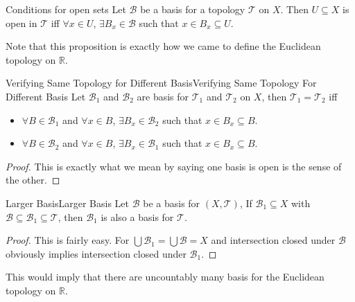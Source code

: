 \documentclass[../main.tex]{subfiles}
\begin{document}
\begin{proposition}{}{Conditions for open sets}
	Let $\mathcal{B}$ be a basis for a topology $\mathcal{T}$ on $X$. Then $U\subseteq X$ is open in $\mathcal{T}$ iff $\forall x\in U$, $\exists B_x\in \mathcal{B}$ such that $x\in B_x\subseteq U$.
\end{proposition}
Note that this proposition is exactly how we came to define the Euclidean topology on $\mathbb{R}$.

\begin{theorem}{Verifying Same Topology for Different Basis}{Verifying Same Topology For Different Basis}
Let $\mathcal{B}_1$ and $\mathcal{B}_2$ are basis for $\mathcal{T}_1$ and $\mathcal{T}_2$ on $X$, then $\mathcal{T}_1 = \mathcal{T}_2$ iff
\begin{itemize}
	\item $\forall B \in \mathcal{B}_1$ and $\forall x\in B$, $\exists B_x\in \mathcal{B}_2$ such that $x\in B_x\subseteq B$.
	\item $\forall B \in \mathcal{B}_2$ and $\forall x\in B$, $\exists B_x\in \mathcal{B}_1$ such that $x\in B_x\subseteq B$.
\end{itemize}
\end{theorem}
\begin{proof}
This is exactly what we mean by saying one basis is open is the sense of the other.
\end{proof}

\begin{proposition}{Larger Basis}{Larger Basis}
Let $\mathcal{B}$ be a basis for $(X,\mathcal{T})$, If $\mathcal{B}_1 \subseteq X$ with $\mathcal{B} \subseteq \mathcal{B}_1 \subseteq \mathcal{T}$, then $\mathcal{B}_1$ is also a basis for $\mathcal{T}$.
\end{proposition}
\begin{proof}
	This is fairly easy. For $\bigcup \mathcal{B}_1 = \bigcup \mathcal{B} = X$ and intersection closed under $\mathcal{B}$ obviously implies intersection closed under $\mathcal{B}_1$.
\end{proof}
This would imply that there are uncountably many basis for the Euclidean topology on $\mathbb{R}$.
\end{document}
